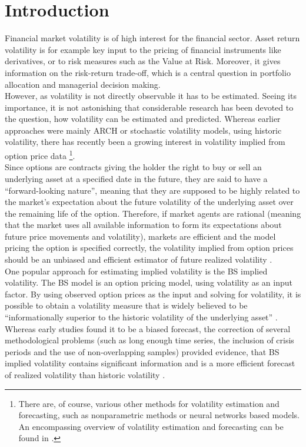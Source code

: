 
\section{Introduction}\label{sec:1Intro}
Financial market volatility is of high interest for the financial sector. Asset return volatility is for example key input to the pricing of financial instruments like derivatives, or to risk measures such as the Value at Risk. Moreover, it gives information on the risk-return trade-off, which is a central question in portfolio allocation and managerial decision making. \\
However, as volatility is not directly observable it has to be estimated. Seeing its importance, it is not astonishing that considerable research has been devoted to the question, how volatility can be estimated and predicted. Whereas earlier approaches were mainly ARCH or stochastic volatility models, using historic volatility, there has recently been a growing interest in volatility implied from option price data \parencite{bakanova2010}\footnote{There are, of course, various other methods for volatility estimation and forecasting, such as nonparametric methods or neural networks based models. An encompassing overview of volatility estimation and forecasting can be found in \textcite{jiang2003}.}.\\
Since options are contracts giving the holder the right to buy or sell an underlying asset at a specified date in the future, they are said to have a ``forward-looking nature'', meaning that they are supposed to be highly related to the market's expectation about the future volatility of the underlying asset over the remaining life of the option. Therefore, if market agents are rational (meaning that the market uses all available information to form its expectations about future price movements and volatility), markets are efficient and the model pricing the option is specified correctly, the volatility implied from option prices should be an unbiased and efficient estimator of future realized volatility \parencite{bakanova2010}.\\
One popular approach for estimating implied volatility is the \ac{BS} implied volatility. The \ac{BS} model is an option pricing model, using volatility as an input factor. By using observed option prices as the input and solving for volatility, it is possible to obtain a volatility measure that is widely believed to be ``informationally superior to the historic volatility of the underlying asset'' \parencite[p. 1305]{jiang2003}. Whereas early studies found it to be a biased forecast, the correction of several methodological problems (such as long enough time series, the inclusion of crisis periods and the use of non-overlapping samples) provided evidence, that \ac{BS} implied volatility contains significant information and is a more efficient forecast of realized volatility than historic volatility \parencite{jiang2003}.\\
